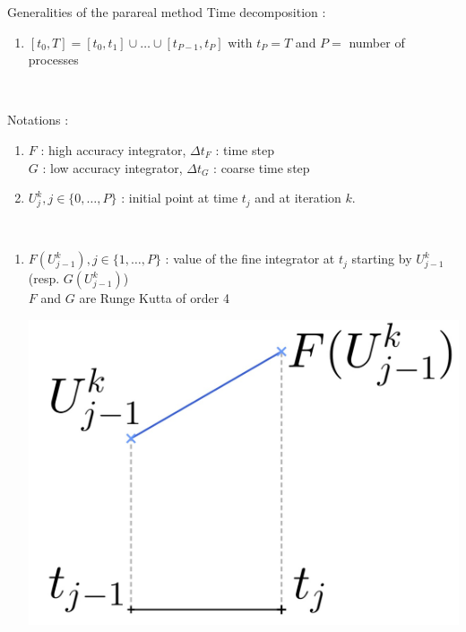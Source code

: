 \begin{frame}{Generalities of the parareal method}
	Time decomposition :
	\begin{enumerate}[\textbullet]
		\item $[t_0,T]=[t_0,t_1]\cup\dots\cup[t_{P-1},t_P]$ with $t_P=T$ and $P=$ number of processes
	\end{enumerate}

	\; \\

	\begin{minipage}{\linewidth}
		Notations :
		\begin{enumerate}[\textbullet]
			\item $F$ : high accuracy integrator, \quad $\Delta t_F$ : time step \\
			$G$ : low accuracy integrator, \quad $\Delta t_G$ : coarse time step
			\item $U_j^k, j\in\{0,\dots,P\}$ : initial point at time $t_j$ and at iteration $k$.
		\end{enumerate}
	\end{minipage} \\
	\begin{enumerate}[\textbullet]
		\item $F(U_{j-1}^k), j\in\{1,\dots,P\}$ : value of the fine integrator at $t_j$ starting by $U_{j-1}^k$ \\
		(resp. $G(U_{j-1}^k)$) \\
		$F$ and $G$ are Runge Kutta of order 4 
		\begin{minipage}{\linewidth}
			\centering
			\qquad \qquad \qquad \qquad \qquad \qquad \qquad
			\includegraphics[width=0.3\linewidth]{images/parareal/explane_F.jpg}
		\end{minipage}
	\end{enumerate}
	
	
\end{frame}

